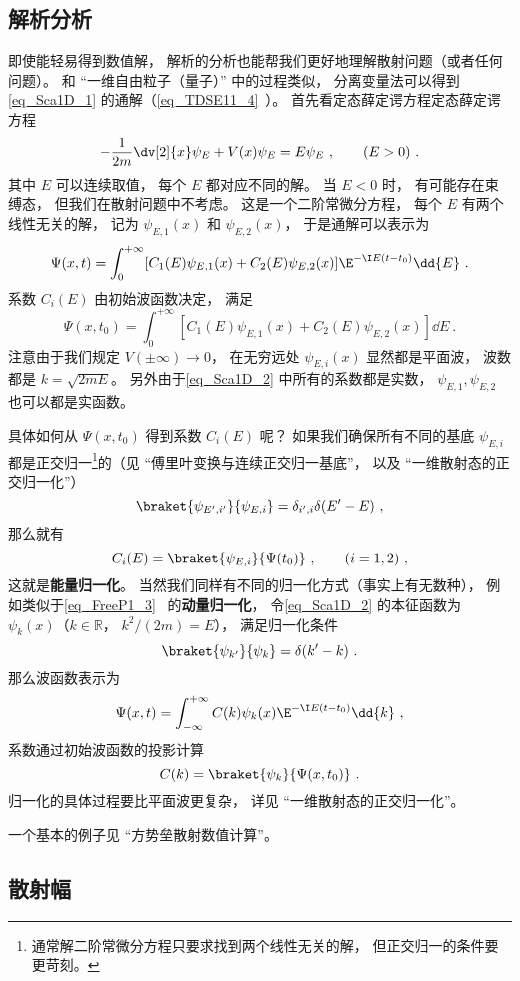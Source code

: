 \subsection{解析分析}
即使能轻易得到数值解， 解析的分析也能帮我们更好地理解散射问题（或者任何问题）。 和 “一维自由粒子（量子）” 中的过程类似， 分离变量法可以得到\autoref{eq_Sca1D_1} 的通解（\autoref{eq_TDSE11_4}~）。 首先看定态薛定谔方程定态薛定谔方程
\begin{equation}\label{eq_Sca1D_2}
-\frac{1}{2m}\dv[2]{x}\psi_E + V(x) \psi_E = E \psi_E ~,\qquad (E > 0)~.
\end{equation}
其中 $E$ 可以连续取值， 每个 $E$ 都对应不同的解。 当 $E< 0$ 时， 有可能存在束缚态， 但我们在散射问题中不考虑。 这是一个二阶常微分方程， 每个 $E$ 有两个线性无关的解， 记为 $\psi_{E,1}(x)$ 和 $\psi_{E,2}(x)$， 于是通解可以表示为
\begin{equation}
\Psi(x, t) = \int_0^{+\infty} [C_1(E) \psi_{E,1}(x) + C_2(E) \psi_{E,2}(x)] \E^{-\I E (t-t_0)} \dd{E}~.
\end{equation}
系数 $C_i(E)$ 由初始波函数决定， 满足
\begin{equation}
\Psi(x, t_0) = \int_0^{+\infty} [C_1(E) \psi_{E,1}(x) + C_2(E) \psi_{E,2}(x)] \dd{E}~.
\end{equation}
注意由于我们规定 $V(\pm\infty)\to 0$， 在无穷远处 $\psi_{E,i}(x)$ 显然都是平面波， 波数都是 $k = \sqrt{2mE}$。 另外由于\autoref{eq_Sca1D_2} 中所有的系数都是实数， $\psi_{E,1}, \psi_{E,2}$ 也可以都是实函数。

具体如何从 $\Psi(x, t_0)$ 得到系数 $C_i(E)$ 呢？ 如果我们确保所有不同的基底 $\psi_{E,i}$ 都是正交归一\footnote{通常解二阶常微分方程只要求找到两个线性无关的解， 但正交归一的条件要更苛刻。}的（见 “傅里叶变换与连续正交归一基底”， 以及 “一维散射态的正交归一化”）
\begin{equation}
\braket{\psi_{E',i'}}{\psi_{E,i}} = \delta_{i',i}\delta(E' - E)~,
\end{equation}
那么就有
\begin{equation}
C_i(E) = \braket{\psi_{E,i}}{\Psi(t_0)}~, \qquad (i = 1,2)~,
\end{equation}
这就是\textbf{能量归一化}。 当然我们同样有不同的归一化方式（事实上有无数种）， 例如类似于\autoref{eq_FreeP1_3}~ 的\textbf{动量归一化}， 令\autoref{eq_Sca1D_2} 的本征函数为 $\psi_{k}(x)$（$k \in \mathbb R$， $k^2/(2m) = E$）， 满足归一化条件
\begin{equation}
\braket{\psi_{k'}}{\psi_{k}} = \delta(k' - k)~.
\end{equation}
那么波函数表示为
\begin{equation}\label{eq_Sca1D_3}
\Psi(x, t) = \int_{-\infty}^{+\infty} C(k) \psi_k(x)\E^{-\I E (t-t_0)} \dd{k}~,
\end{equation}
系数通过初始波函数的投影计算
\begin{equation}
C(k) = \braket{\psi_k}{\Psi(x, t_0)}~.
\end{equation}
归一化的具体过程要比平面波更复杂， 详见 “一维散射态的正交归一化”。

一个基本的例子见 “方势垒散射数值计算”。

\subsection{散射幅}
